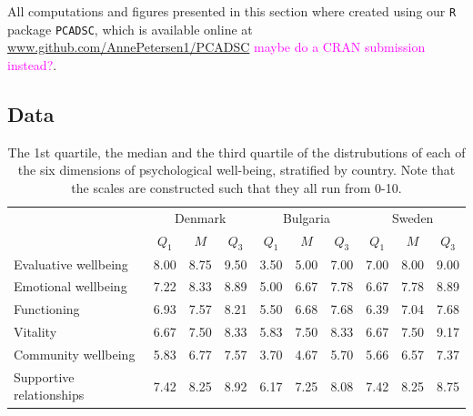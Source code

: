 \documentclass[titlepage,11pt,twoside]{article}
\newcommand{\hl}[1]{\textcolor{magenta}{#1}}
\newcommand{\R}[1]{\texttt{#1}}
\begin{document}

All computations and figures presented in this section where created using our \R{R} package \R{PCADSC}, which is available online at \url{www.github.com/AnnePetersen1/PCADSC} \hl{maybe do a CRAN submission instead?}.

\subsection{Data}


\begin{table}[t]
\centering
\begin{tabular}{lccccccccc}
  \hline
  & \multicolumn{3}{c}{Denmark} & \multicolumn{3}{c}{Bulgaria} & \multicolumn{3}{c}{Sweden} \\
 & $Q_1$ & $M$ & $Q_3$ \quad & $Q_1$ & $M$ & $Q_3$ \quad & $Q_1$ & $M$ & $Q_3$ \\
  \hline
 Evaluative wellbeing & 8.00 & 8.75 & 9.50 & 3.50 & 5.00 & 7.00 & 7.00 & 8.00 & 9.00 \\
 Emotional wellbeing & 7.22 & 8.33 & 8.89 & 5.00 & 6.67 & 7.78 & 6.67 & 7.78 & 8.89 \\
Functioning & 6.93 & 7.57 & 8.21 & 5.50 & 6.68 & 7.68 & 6.39 & 7.04 & 7.68 \\
Vitality & 6.67 & 7.50 & 8.33 & 5.83 & 7.50 & 8.33 & 6.67 & 7.50 & 9.17 \\
 Community wellbeing & 5.83 & 6.77 & 7.57 & 3.70 & 4.67 & 5.70 & 5.66 & 6.57 & 7.37 \\
Supportive relationships & 7.42 & 8.25 & 8.92 & 6.17 & 7.25 & 8.08 & 7.42 & 8.25 & 8.75 \\
   \hline
\end{tabular}
\caption{The 1st quartile, the median and the third quartile of the distrubutions of each of the six dimensions of psychological well-being, stratified by country. Note that the scales are constructed such that they all run from 0-10.}
\label{tableDistr}
\end{table}
\end{document}
